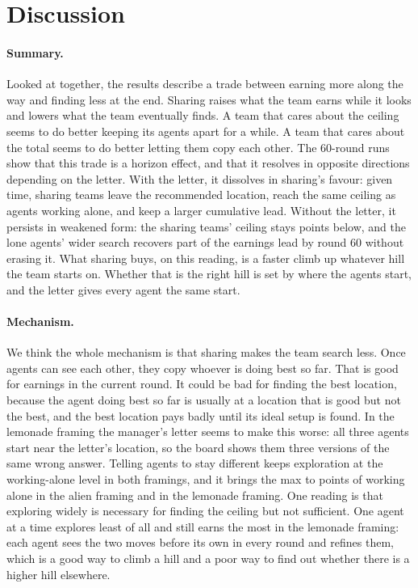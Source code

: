 \section{Discussion}\label{sec:discussion}

\paragraph{Summary.}
Looked at together, the results describe a trade between earning more along the way and finding less at the
end. Sharing raises what the team earns while it looks and lowers what the team eventually finds. A team that
cares about the ceiling seems to do better keeping its agents apart for a while. A team that cares about the
total seems to do better letting them copy each other. The 60-round runs show that this trade is a horizon
effect, and that it resolves in opposite directions depending on the letter. With the letter, it dissolves in
sharing's favour: given time, sharing teams leave the recommended location, reach the same ceiling as agents
working alone, and keep a larger cumulative lead. Without the letter, it persists in weakened form: the sharing
teams' ceiling stays \HAliMaxFull{} points below, and the lone agents' wider search recovers part of the
earnings lead by round 60 without erasing it. What sharing buys, on this reading, is a faster climb up whatever hill
the team starts on. Whether that is the right hill is set by where the agents start, and the letter gives every
agent the same start.

\paragraph{Mechanism.}
We think the whole mechanism is that sharing makes the team search less. Once agents can see each other,
they copy whoever is doing best so far. That is good for earnings in the current round. It could be bad for
finding the best location, because the agent doing best so far is usually at a location that is good but
not the best, and the best location pays badly until its ideal setup is found. In the lemonade framing the
manager's letter seems to make this worse: all three agents start near the letter's location, so the board
shows them three versions of the same wrong answer. Telling agents to stay different keeps exploration at the
working-alone level in both framings, and it brings the max to \AliProtocolMaxDiff{} points of working alone in
the alien framing and \LemProtocolMaxDiff{} in the lemonade framing. One reading is that exploring widely is necessary for finding the
ceiling but not sufficient. One agent at a time explores least of all and still earns the most in the
lemonade framing: each agent sees the two moves before its own in every round and refines them, which is a
good way to climb a hill and a poor way to find out whether there is a higher hill elsewhere.

